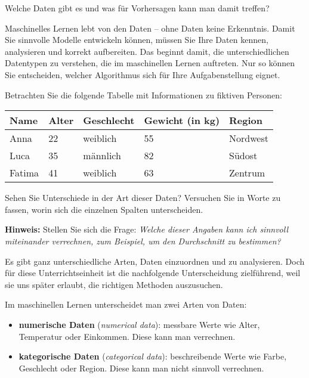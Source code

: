 \begin{lpu}{Welche Daten gibt es und was für Vorhersagen kann man damit treffen?}

Maschinelles Lernen lebt von den Daten – ohne Daten keine Erkenntnis. Damit Sie sinnvolle Modelle entwickeln k\"onnen, m\"ussen Sie Ihre Daten kennen, analysieren und korrekt aufbereiten. Das beginnt damit, die unterschiedlichen Datentypen zu verstehen, die im maschinellen Lernen auftreten. Nur so k\"onnen Sie entscheiden, welcher Algorithmus sich f\"ur Ihre Aufgabenstellung eignet.

\begin{aufgabe}{1}
Betrachten Sie die folgende Tabelle mit Informationen zu fiktiven Personen: \vspace{0.5em}

\begin{center}
\begin{tabular}{|l|l|l|l|l|}
\hline
\textbf{Name} & \textbf{Alter} & \textbf{Geschlecht} & \textbf{Gewicht (in kg)} & \textbf{Region} \\
\hline
Anna   & 22    & weiblich  & 55   & Nordwest \\
Luca   & 35    & m\"annlich & 82   & S\"udost \\
Fatima & 41    & weiblich  & 63  & Zentrum \\
\hline
\end{tabular}
\end{center}

Sehen Sie Unterschiede in der Art dieser Daten? Versuchen Sie in Worte zu fassen, worin sich die einzelnen Spalten unterscheiden.

\textbf{Hinweis:} Stellen Sie sich die Frage: \textit{Welche dieser Angaben kann ich sinnvoll miteinander verrechnen, zum Beispiel, um den Durchschnitt zu bestimmen?}
\end{aufgabe}

Es gibt ganz unterschiedliche Arten, Daten einzuordnen und zu analysieren. Doch für diese Unterrichtseinheit ist die nachfolgende Unterscheidung zielführend, weil sie uns später erlaubt, die richtigen Methoden auszusuchen.

\begin{theorie}
Im maschinellen Lernen unterscheidet man zwei Arten von Daten:
\begin{itemize}
  \item \textbf{numerische Daten} (\emph{numerical data}): messbare Werte wie Alter, Temperatur oder Einkommen. Diese kann man verrechnen.
  \item \textbf{kategorische Daten} (\emph{categorical data}): beschreibende Werte wie Farbe, Geschlecht oder Region. Diese kann man nicht sinnvoll verrechnen.
\end{itemize}
\end{theorie}


\end{lpu}
